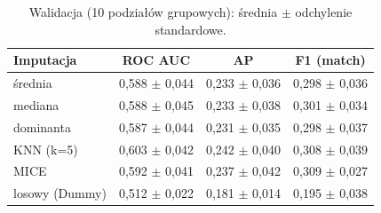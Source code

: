 \begin{table}[H]
\centering
\caption{Walidacja (10 podziałów grupowych): średnia $\pm$ odchylenie standardowe.}
\label{tab:val}
\scriptsize
\setlength{\tabcolsep}{4pt}
\begin{tabular}{@{}lccc@{}}
\toprule
Imputacja & ROC AUC & AP & F1 (match)\\
\midrule
średnia & 0{,}588 $\pm$ 0{,}044 & 0{,}233 $\pm$ 0{,}036 & 0{,}298 $\pm$ 0{,}036\\
mediana & 0{,}588 $\pm$ 0{,}045 & 0{,}233 $\pm$ 0{,}038 & 0{,}301 $\pm$ 0{,}034\\
dominanta & 0{,}587 $\pm$ 0{,}044 & 0{,}231 $\pm$ 0{,}035 & 0{,}298 $\pm$ 0{,}037\\
KNN (k=5) & 0{,}603 $\pm$ 0{,}042 & 0{,}242 $\pm$ 0{,}040 & 0{,}308 $\pm$ 0{,}039\\
MICE & 0{,}592 $\pm$ 0{,}041 & 0{,}237 $\pm$ 0{,}042 & 0{,}309 $\pm$ 0{,}027\\
losowy (Dummy) & 0{,}512 $\pm$ 0{,}022 & 0{,}181 $\pm$ 0{,}014 & 0{,}195 $\pm$ 0{,}038\\
\bottomrule
\end{tabular}
\end{table}
